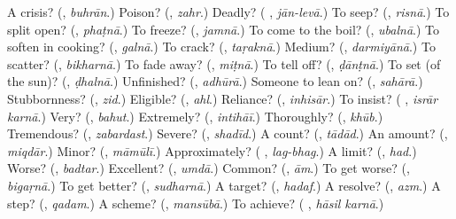\begin{tcolorbox}[breakable,colback=teal!4,colframe=teal!35!black,title={Before you move on}]
A crisis? (\textbf{}, \emph{buhrān}.) Poison? (\textbf{}, \emph{zahr}.) Deadly? (\textbf{ }, \emph{jān-levā}.) To seep? (\textbf{}, \emph{risnā}.) To split open? (\textbf{}, \emph{phaṭnā}.) To freeze? (\textbf{}, \emph{jamnā}.) To come to the boil? (\textbf{}, \emph{ubalnā}.) To soften in cooking? (\textbf{}, \emph{galnā}.) To crack? (\textbf{}, \emph{taṛaknā}.) Medium? (\textbf{}, \emph{darmiyānā}.) To scatter? (\textbf{}, \emph{bikharnā}.) To fade away? (\textbf{}, \emph{miṭnā}.) To tell off? (\textbf{}, \emph{ḍānṭnā}.) To set (of the sun)? (\textbf{}, \emph{ḍhalnā}.) Unfinished? (\textbf{}, \emph{adhūrā}.) Someone to lean on? (\textbf{}, \emph{sahārā}.) Stubbornness? (\textbf{}, \emph{zid}.) Eligible? (\textbf{}, \emph{ahl}.) Reliance? (\textbf{}, \emph{inhisār}.) To insist? (\textbf{ }, \emph{isrār karnā}.) Very? (\textbf{}, \emph{bahut}.) Extremely? (\textbf{}, \emph{intihāī}.) Thoroughly? (\textbf{}, \emph{khūb}.) Tremendous? (\textbf{}, \emph{zabardast}.) Severe? (\textbf{}, \emph{shadīd}.) A count? (\textbf{}, \emph{tādād}.) An amount? (\textbf{}, \emph{miqdār}.) Minor? (\textbf{}, \emph{māmūlī}.) Approximately? (\textbf{ }, \emph{lag-bhag}.) A limit? (\textbf{}, \emph{had}.) Worse? (\textbf{}, \emph{badtar}.) Excellent? (\textbf{}, \emph{umdā}.) Common? (\textbf{}, \emph{ām}.) To get worse? (\textbf{}, \emph{bigaṛnā}.) To get better? (\textbf{}, \emph{sudharnā}.) A target? (\textbf{}, \emph{hadaf}.) A resolve? (\textbf{}, \emph{azm}.) A step? (\textbf{}, \emph{qadam}.) A scheme? (\textbf{}, \emph{mansūbā}.) To achieve? (\textbf{ }, \emph{hāsil karnā}.)
\end{tcolorbox}
